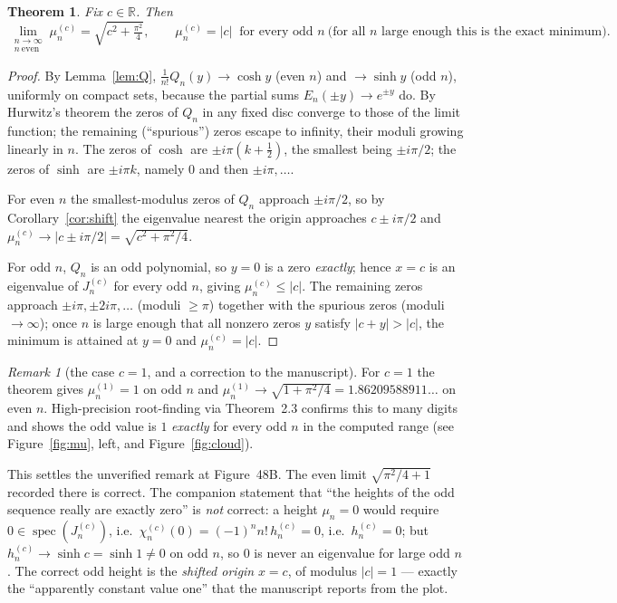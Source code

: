 \documentclass[11pt, fleqn]{amsart}
\newtheorem{theorem}{Theorem}[section]
\theoremstyle{remark}
\newtheorem{remark}{Remark}
\DeclareMathOperator{\spec}{spec}
\begin{document}
\begin{theorem}\label{thm:limits}
Fix $c\in\mathbb{R}$. Then
\[
\lim_{\substack{n\to\infty\\ n\ \mathrm{even}}}\mu^{(c)}_n=\sqrt{c^2+\tfrac{\pi^2}{4}},
\qquad
\mu^{(c)}_n=|c|\ \text{ for every odd }n\ \text{(for all $n$ large enough this is the exact minimum).}
\]
\end{theorem}

\begin{proof}
By Lemma~\ref{lem:Q}, $\tfrac{1}{n!}Q_n(y)\to\cosh y$ (even $n$) and $\to\sinh y$ (odd
$n$), uniformly on compact sets, because the partial sums $E_n(\pm y)\to e^{\pm y}$ do. By
Hurwitz's theorem the zeros of $Q_n$ in any fixed disc converge to those of the limit
function; the remaining (``spurious'') zeros escape to infinity, their moduli growing
linearly in $n$. The zeros of $\cosh$ are $\pm i\pi(k+\tfrac12)$, the smallest being
$\pm i\pi/2$; the zeros of $\sinh$ are $\pm i\pi k$, namely $0$ and then $\pm i\pi,\dots$.

For even $n$ the smallest-modulus zeros of $Q_n$ approach $\pm i\pi/2$, so by
Corollary~\ref{cor:shift} the eigenvalue nearest the origin approaches $c\pm i\pi/2$ and
$\mu^{(c)}_n\to|c\pm i\pi/2|=\sqrt{c^2+\pi^2/4}$.

For odd $n$, $Q_n$ is an odd polynomial, so $y=0$ is a zero \emph{exactly}; hence $x=c$ is
an eigenvalue of $J^{(c)}_n$ for every odd $n$, giving $\mu^{(c)}_n\le|c|$. The remaining
zeros approach $\pm i\pi,\pm 2i\pi,\dots$ (moduli $\ge\pi$) together with the spurious
zeros (moduli $\to\infty$); once $n$ is large enough that all nonzero zeros $y$ satisfy
$|c+y|>|c|$, the minimum is attained at $y=0$ and $\mu^{(c)}_n=|c|$.
\end{proof}

\begin{remark}[the case $c=1$, and a correction to the manuscript]\label{rem:correction}
For $c=1$ the theorem gives $\mu^{(1)}_n=1$ on odd $n$ and
$\mu^{(1)}_n\to\sqrt{1+\pi^2/4}=1.86209588911\ldots$ on even $n$. High-precision
root-finding via Theorem~2.3 confirms this to many digits and shows the odd value is
$1$ \emph{exactly} for every odd $n$ in the computed range (see Figure~\ref{fig:mu},
left, and Figure~\ref{fig:cloud}).

This settles the unverified remark at Figure~48B. The even limit
$\sqrt{\pi^2/4+1}$ recorded there is correct. The companion statement that ``the heights
of the odd sequence really are exactly zero'' is \emph{not} correct: a height $\mu_n=0$
would require $0\in\spec(J^{(c)}_n)$, i.e.\ $\chi^{(c)}_n(0)=(-1)^n n!\,h^{(c)}_n=0$, i.e.\
$h^{(c)}_n=0$; but $h^{(c)}_n\to\sinh c=\sinh 1\neq0$ on odd $n$, so $0$ is never an
eigenvalue for large odd $n$. The correct odd height is the \emph{shifted origin}
$x=c$, of modulus $|c|=1$ --- exactly the ``apparently constant value one'' that the
manuscript reports from the plot.
\end{remark}
\end{document}
